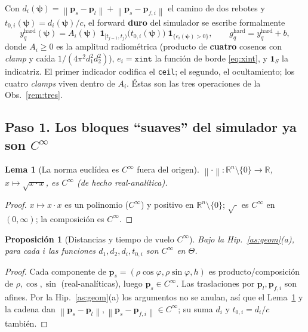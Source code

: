 \documentclass[11pt,a4paper]{article}
\theoremstyle{plain}
\newtheorem{lemma}[theorem]{Lema}
\newtheorem{proposition}[theorem]{Proposici\'on}
\theoremstyle{definition}
\newcommand{\vect}[1]{\boldsymbol{#1}}
\newcommand{\R}{\mathbb{R}}
\newcommand{\norm}[1]{\left\lVert #1 \right\rVert}
\begin{document}
Con $d_i(\vect{\psi})=\norm{\vect{p}_s-\vect{p}_l}+\norm{\vect{p}_s-\vect{p}_{f,i}}$
el camino de dos rebotes y $t_{0,i}(\vect{\psi})=d_i(\vect{\psi})/c$, el forward
\textbf{duro} del simulador se escribe formalmente
\begin{equation}
    y^{\mathrm{hard}}_q(\vect{\psi})
    =A_i(\vect{\psi})\;
    \mathbf{1}_{[t_{j-1},t_j)}\!\bigl(t_{0,i}(\vect{\psi})\bigr)\;
    \mathbf{1}_{\{e_i(\vect{\psi})>0\}},
    \qquad g^{\mathrm{hard}}_q=y^{\mathrm{hard}}_q+b,
    \label{eq:hard}
\end{equation}
donde $A_i\ge0$ es la amplitud radiom\'etrica (producto de \textbf{cuatro}
cosenos con \emph{clamp} y ca\'ida $1/(4\pi^2 d_1^2 d_2^2)$), $e_i=\texttt{xint}$
la funci\'on de borde \eqref{eq:xint}, y $\mathbf 1_S$ la indicatriz. El primer
indicador codifica el \texttt{ceil}; el segundo, el ocultamiento; los cuatro
\emph{clamps} viven dentro de $A_i$. \'Estas son las tres operaciones de la
Obs.~\ref{rem:tres}.

\subsection*{Paso 1. Los bloques ``suaves'' del simulador ya son \texorpdfstring{$C^\infty$}{C-inf}}
\label{sec:reg-suaves}

\begin{lemma}[La norma eucl\'idea es $C^\infty$ fuera del origen]\label{lem:norm}
$\norm{\cdot}:\R^n\setminus\{0\}\to\R$, $x\mapsto\sqrt{x\cdot x}$, es $C^\infty$
(de hecho real-anal\'itica).
\end{lemma}
\begin{proof}
$x\mapsto x\cdot x$ es un polinomio ($C^\infty$) y positivo en
$\R^n\setminus\{0\}$; $\sqrt{\cdot}$ es $C^\infty$ en $(0,\infty)$; la
composici\'on es $C^\infty$.
\end{proof}

\begin{proposition}[Distancias y tiempo de vuelo $C^\infty$]\label{prop:dist}
Bajo la Hip.~\ref{as:geom}(a), para cada $i$ las funciones $d_1,d_2,d_i,t_{0,i}$
son $C^\infty$ en $\Theta$.
\end{proposition}
\begin{proof}
Cada componente de $\vect{p}_s=(\rho\cos\varphi,\rho\sin\varphi,h)$ es
producto/composici\'on de $\rho,\cos,\sin$ (real-anal\'iticas), luego
$\vect{p}_s\in C^\infty$. Las traslaciones por $\vect{p}_l,\vect{p}_{f,i}$ son
afines. Por la Hip.~\ref{as:geom}(a) los argumentos no se anulan, as\'i que el
Lema~\ref{lem:norm} y la cadena dan $\norm{\vect{p}_s-\vect{p}_l},
\norm{\vect{p}_s-\vect{p}_{f,i}}\in C^\infty$; su suma $d_i$ y $t_{0,i}=d_i/c$
tambi\'en.
\end{proof}
\end{document}
